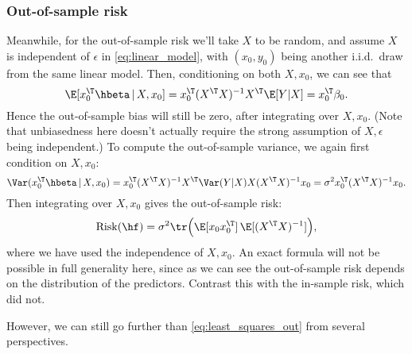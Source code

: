 \documentclass{article}
\begin{document}
\subsubsection{Out-of-sample risk}

Meanwhile, for the out-of-sample risk we'll take $X$ to be random, and assume
$X$ is independent of $\epsilon$ in \eqref{eq:linear_model}, with $(x_0,y_0)$
being another i.i.d.\ draw from the same linear model. Then, conditioning on
both $X,x_0$, we can see that 
\[
\E [x_0^\T \hbeta \,|\, X,x_0] = x_0^\T (X^\T X)^{-1} X^\T \E[Y|X] = x_0^\T \beta_0.   
\]
Hence the out-of-sample bias will still be zero, after integrating over
$X,x_0$. (Note that unbiasedness here doesn't actually require the strong
assumption of $X,\epsilon$ being independent.) To compute the out-of-sample 
variance, we again first condition on $X,x_0$:
\[
\Var(x_0^\T \hbeta \,|\, X, x_0) = x_0^\T (X^\T X)^{-1} X^\T \Var(Y|X)
X (X^\T X)^{-1} x_0 = \sigma^2 x_0^\T (X^\T X)^{-1} x_0.
\]
Then integrating over $X,x_0$ gives the out-of-sample risk:
\begin{equation}
\label{eq:least_squares_out}
\Risk(\hf) = \sigma^2 \tr\Big(\E [x_0 x_0^\T] \, \E [(X^\T X)^{-1}] \Big), 
\end{equation}
where we have used the independence of $X,x_0$. An exact formula will not be
possible in full generality here, since as we can see the out-of-sample risk
depends on the distribution of the predictors. Contrast this with the in-sample
risk, which did not.

However, we can still go further than \eqref{eq:least_squares_out} from several
perspectives.   
\end{document}

